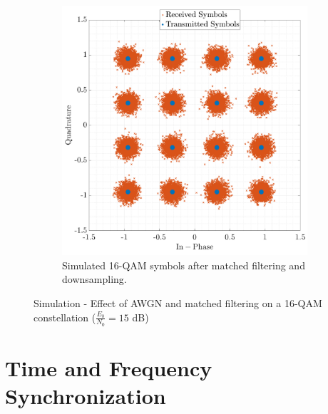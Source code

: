 \documentclass[11pt]{article}
\begin{document}
\begin{figure}[H]
\begin{subfigure}{0.48\textwidth}
			\includegraphics[width=\linewidth]{Images/const-filtered-down.png} 
			\caption{Simulated 16-QAM symbols after matched filtering and downsampling.}
			\label{fig:const-filtered-down_cont}
		\end{subfigure}
		\caption{Simulation - Effect of AWGN and matched filtering on a 16-QAM constellation ($\frac{E_b}{N_0} = 15$ dB)}
		\label{fig:constellations-noise_cont}
	\end{figure}
	
	\section{Time and Frequency Synchronization}
\end{document}
